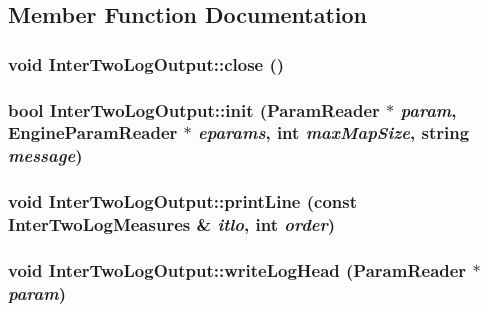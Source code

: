 \subsection{Member Function Documentation}
\hypertarget{classInterTwoLogOutput_a81ed7b00f76b57d81bc4e504d9f36c66}{
\subsubsection[{close}]{\setlength{\rightskip}{0pt plus 5cm}void InterTwoLogOutput::close ()}}
\label{classInterTwoLogOutput_a81ed7b00f76b57d81bc4e504d9f36c66}
\hypertarget{classInterTwoLogOutput_a6bf1b2c7e2f158d2484cafaf08ff4a7c}{
\subsubsection[{init}]{\setlength{\rightskip}{0pt plus 5cm}bool InterTwoLogOutput::init ({\bf ParamReader} $\ast$ {\em param}, \/  {\bf EngineParamReader} $\ast$ {\em eparams}, \/  int {\em maxMapSize}, \/  string {\em message})}}
\label{classInterTwoLogOutput_a6bf1b2c7e2f158d2484cafaf08ff4a7c}
\hypertarget{classInterTwoLogOutput_ae4cccc1f183d1d224e77360d00b9f3b9}{
\subsubsection[{printLine}]{\setlength{\rightskip}{0pt plus 5cm}void InterTwoLogOutput::printLine (const {\bf InterTwoLogMeasures} \& {\em itlo}, \/  int {\em order})}}
\label{classInterTwoLogOutput_ae4cccc1f183d1d224e77360d00b9f3b9}
\hypertarget{classInterTwoLogOutput_a4856f3d92e9d3c691f991797825d1bcc}{
\subsubsection[{writeLogHead}]{\setlength{\rightskip}{0pt plus 5cm}void InterTwoLogOutput::writeLogHead ({\bf ParamReader} $\ast$ {\em param})}}
